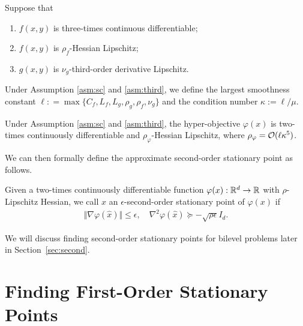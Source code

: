 \documentclass[twoside,11pt]{article}
\begin{document}
\begin{asm} \label{asm:third}
Suppose that
\begin{enumerate}[label=\alph*.]
    \item $f(x,y)$ is three-times continuous differentiable;
    \item $f(x,y)$ is $\rho_f$-Hessian Lipschitz;
    \item  $ g(x,y)$ is $\nu_g$-third-order derivative Lipschitz.
\end{enumerate}
\end{asm}

\begin{dfn} \label{dfn:kappa-third}
Under Assumption \ref{asm:sc} and \ref{asm:third}, we define the largest smoothness constant $\ell: =\max \{ C_f,L_f,L_g,\rho_g,\rho_f,\nu_g  \}$ and the condition number 
$\kappa:= \ell / \mu$. 
\end{dfn}

\begin{prop} \label{prop:Hess-smooth}
    Under Assumption \ref{asm:sc} and \ref{asm:third}, the hyper-objective $\varphi(x)$ is two-times continuously differentiable and $\rho_\varphi$-Hessian Lipschitz, where $\rho_\varphi = {\mathcal{O}}(\ell \kappa^5)$.
\end{prop}

We can then formally define the
 approximate second-order stationary point as follows.
\begin{dfn} \label{dfn:sta-hyper-second}
Given a two-times continuously differentiable function $\varphi(x): {\mathbb{R}}^d \rightarrow {\mathbb{R}} $ with $\rho$-Lipschitz Hessian,
we call $\hat x$ an $\epsilon$-second-order stationary point of $\varphi(x)$ if 
\begin{align*}
    \Vert \nabla \varphi(\hat x) \Vert \le \epsilon,\quad  \nabla^2 \varphi(\hat x)  \succeq -\sqrt{\rho \epsilon}  I_{d}.
\end{align*}
\end{dfn}
We will discuss finding second-order stationary points for bilevel problems later in Section~\ref{sec:second}.



\section{Finding First-Order Stationary Points} \label{sec:first}
\end{document}
